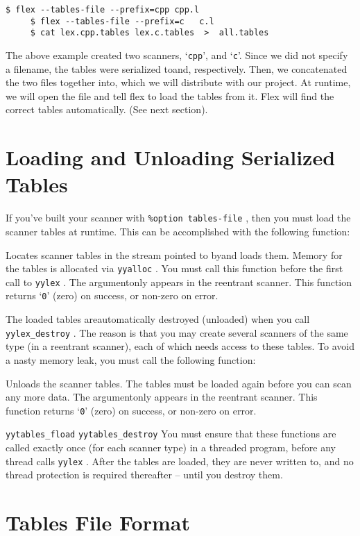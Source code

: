 \documentclass[openany,oneside]{book}
\begin{document}
\begin{verbatim}
$ flex --tables-file --prefix=cpp cpp.l
     $ flex --tables-file --prefix=c   c.l
     $ cat lex.cpp.tables lex.c.tables  >  all.tables
\end{verbatim}


The above example created two scanners, ‘\verb`cpp`’, and ‘\verb`c`’. Since we did
not specify a filename, the tables were serialized toand, respectively. Then, we concatenated the two files
together into, which we will distribute with our project. At
runtime, we will open the file and tell flex to load the tables from it.  Flex
will find the correct tables automatically. (See next section).
\section{Loading and Unloading Serialized Tables}


If you've built your scanner with \verb`%option tables-file` , then you must
load the scanner tables at runtime. This can be accomplished with the following
function:

Locates scanner tables in the stream pointed to byand loads them. 
Memory for the tables is allocated via \verb`yyalloc` .  You must call this
function before the first call to \verb`yylex` . The argumentonly appears in the reentrant scanner. 
This function returns ‘\verb`0`’ (zero) on success, or non-zero on error.

The loaded tables areautomatically destroyed (unloaded) when you
call \verb`yylex_destroy` . The reason is that you may create several scanners
of the same type (in a reentrant scanner), each of which needs access to these
tables.  To avoid a nasty memory leak, you must call the following function:

Unloads the scanner tables. The tables must be loaded again before you can scan
any more data.  The argumentonly appears in the reentrant
scanner.  This function returns ‘\verb`0`’ (zero) on success, or non-zero on
error.

 \verb`yytables_fload`  \verb`yytables_destroy` You must ensure that these functions are called exactly once (for
each scanner type) in a threaded program, before any thread calls \verb`yylex` . 
After the tables are loaded, they are never written to, and no thread
protection is required thereafter – until you destroy them.
\section{Tables File Format}
\end{document}

